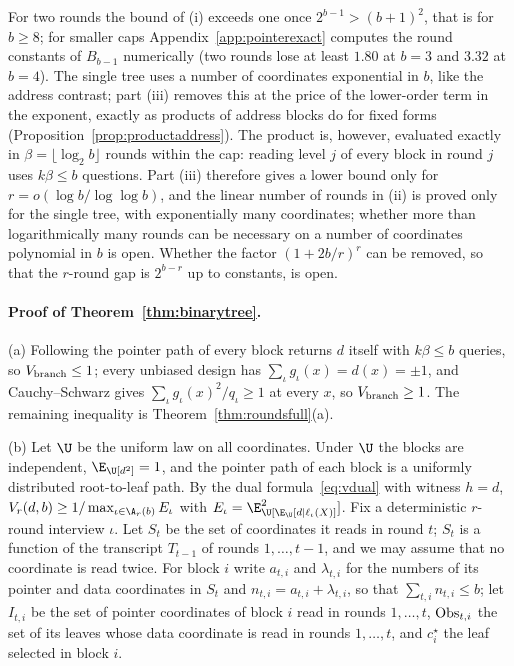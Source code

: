 For two rounds the bound of (i) exceeds one once $2^{b-1}>(b+1)^2$, that is
for $b\ge8$; for smaller caps Appendix~\ref{app:pointerexact} computes the
round constants of $B_{b-1}$ numerically (two rounds lose at least $1.80$ at
$b=3$ and $3.32$ at $b=4$). The single tree uses a number of coordinates
exponential in $b$, like the address contrast; part (iii) removes this at the
price of the lower-order term in the exponent, exactly as products of
address blocks do for fixed forms (Proposition~\ref{prop:productaddress}).
The product is, however, evaluated exactly in $\beta=\lfloor\log_2b\rfloor$
rounds within the cap: reading level $j$ of every block in round $j$ uses
$k\beta\le b$ questions. Part (iii) therefore gives a lower bound only for
$r=o(\log b/\log\log b)$, and the linear number of rounds in (ii) is proved
only for the single tree, with exponentially many coordinates; whether more
than logarithmically many rounds can be necessary on a number of coordinates
polynomial in $b$ is open.
Whether the factor $(1+2b/r)^r$ can be removed, so that the $r$-round gap is
$2^{b-r}$ up to constants, is open.

\paragraph{Proof of Theorem~\ref{thm:binarytree}.}
(a) Following the pointer path of every block returns $d$ itself with
$k\beta\le b$ queries, so $V_{\rm branch}\le1$; every unbiased design has
$\sum_\iota g_\iota(x)=d(x)=\pm1$, and Cauchy--Schwarz gives
$\sum_\iota g_\iota(x)^2/q_\iota\ge1$ at every $x$, so $V_{\rm branch}\ge1$.
The remaining inequality is Theorem~\ref{thm:roundsfull}(a).

(b) Let $\U$ be the uniform law on all coordinates. Under $\U$ the blocks
are independent, $\E_\U[d^2]=1$, and the pointer path of each block is a
uniformly distributed root-to-leaf path. By the dual
formula~\eqref{eq:vdual} with witness $h=d$,
$V_r(d,b)\ge1/\max_{\iota\in\A_r(b)}E_\iota$ with
$E_\iota=\E_\U[\E_\U[d\mid\ell_\iota(X)]^2]$. Fix a deterministic $r$-round
interview $\iota$. Let $S_t$ be the set of coordinates it reads in round $t$;
$S_t$ is a function of the transcript $T_{t-1}$ of rounds $1,\ldots,t-1$, and
we may assume that no coordinate is read twice. For block $i$ write
$a_{t,i}$ and $\lambda_{t,i}$ for the numbers of its pointer and data
coordinates in $S_t$ and $n_{t,i}=a_{t,i}+\lambda_{t,i}$, so that
$\sum_{t,i}n_{t,i}\le b$; let $I_{t,i}$ be the set of pointer coordinates of
block $i$ read in rounds $1,\ldots,t$, ${\rm Obs}_{t,i}$ the set of its leaves
whose data coordinate is read in rounds $1,\ldots,t$, and $c^\star_i$ the leaf
selected in block $i$.

